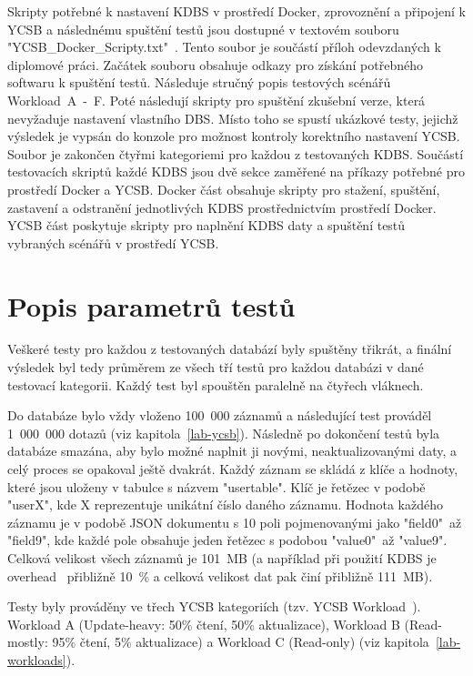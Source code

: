 \documentclass[czech,master,dept460,male,csharp,cpdeclaration]{diploma}
\begin{document}
	Skripty potřebné k nastavení KDBS v prostředí Docker, zprovoznění a připojení k YCSB a následnému spuštění testů jsou dostupné v textovém souboru "YCSB\_Docker\_Scripty.txt"~\cite{skripty-soubor}. Tento soubor je součástí příloh odevzdaných k diplomové práci. Začátek souboru obsahuje odkazy pro získání potřebného softwaru k spuštění testů. Následuje stručný popis testových scénářů Workload~A~-~F. Poté následují skripty pro spuštění zkušební verze, která nevyžaduje nastavení vlastního DBS. Místo toho se spustí ukázkové testy, jejichž výsledek je vypsán do konzole pro možnost kontroly korektního nastavení YCSB. Soubor je zakončen čtyřmi kategoriemi pro každou z testovaných KDBS. Součástí testovacích skriptů každé KDBS jsou dvě sekce zaměřené na příkazy potřebné pro prostředí Docker a YCSB. Docker část obsahuje skripty pro stažení, spuštění, zastavení a odstranění jednotlivých KDBS prostřednictvím prostředí Docker. YCSB část poskytuje skripty pro naplnění KDBS daty a spuštění testů vybraných scénářů v prostředí YCSB.
	
	\section{Popis parametrů testů}\label{test-param}
	
	Veškeré testy pro každou z testovaných databází byly spuštěny třikrát, a finální výsledek byl tedy průměrem ze všech tří testů pro každou databázi v dané testovací kategorii. Každý test byl spouštěn paralelně na čtyřech vláknech.
	
	Do databáze bylo vždy vloženo 100~000 záznamů a následující test prováděl 1~000~000 dotazů (viz kapitola~\ref{lab-ycsb}). Následně po dokončení testů byla databáze smazána, aby bylo možné naplnit ji novými, neaktualizovanými daty, a celý proces se opakoval ještě dvakrát. Každý záznam se skládá z klíče a hodnoty, které jsou uloženy v tabulce s názvem "usertable". Klíč je řetězec v podobě "userX", kde X reprezentuje unikátní číslo daného záznamu. Hodnota každého záznamu je v podobě JSON dokumentu s 10 poli pojmenovanými jako "field0"~až "field9", kde každé pole obsahuje jeden řetězec s podobou "value0"~až "value9". Celková velikost všech záznamů je 101~MB (a například při použití KDBS je overhead~\cite{overhead-pcmag} přibližně 10~\% a celková velikost dat pak činí přibližně 111~MB).
	
	Testy byly prováděny ve třech YCSB kategoriích (tzv. YCSB Workload~\cite{workloads}). Workload A (Update-heavy: 50\% čtení, 50\% aktualizace), Workload B (Read-mostly: 95\% čtení, 5\% aktualizace) a Workload C (Read-only) (viz kapitola~\ref{lab-workloads}).
	
\end{document}
